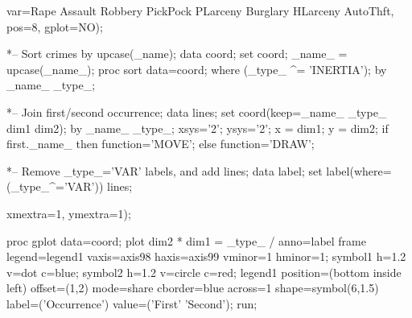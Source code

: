 \begin{listing}
   var=Rape Assault Robbery PickPock PLarceny Burglary HLarceny AutoThft,
   pos=8, gplot=NO);

*-- Sort crimes by upcase(_name);
data coord;
   set coord;
   _name_ = upcase(_name_);
proc sort data=coord;
   where (_type_ ^= 'INERTIA');
   by _name_ _type_;
   
*-- Join first/second occurrence;
data lines;
   set coord(keep=_name_ _type_ dim1 dim2);
   by _name_ _type_;
   xsys='2'; ysys='2';
   x = dim1; y = dim2;
   if first._name_
      then function='MOVE';
      else function='DRAW';

*-- Remove _type_='VAR' labels, and add lines;
data label;
   set label(where=(_type_^='VAR')) lines;

      xmextra=1, ymextra=1);

proc gplot data=coord;
   plot dim2 * dim1 = _type_
        / anno=label frame legend=legend1
          vaxis=axis98 haxis=axis99 vminor=1 hminor=1;
   symbol1 h=1.2 v=dot    c=blue;
   symbol2 h=1.2 v=circle c=red;
   legend1 position=(bottom inside left)  offset=(1,2)
        mode=share cborder=blue
        across=1 shape=symbol(6,1.5)
        label=('Occurrence') value=('First' 'Second');
run;
\end{listing}
